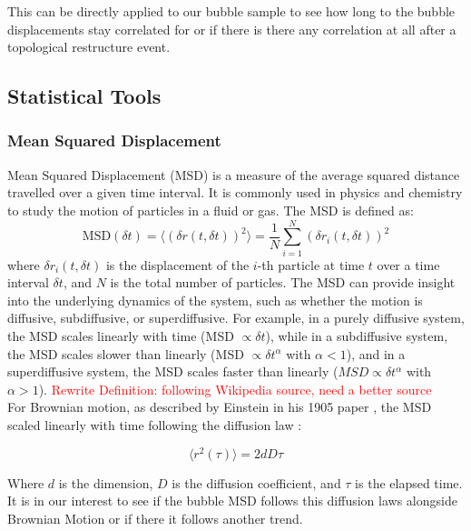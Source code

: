 This can be directly applied to our bubble sample to see how long to the bubble displacements stay correlated for or if there is there any correlation at all after a topological restructure event.


\subsection{Statistical Tools}
\subsubsection{Mean Squared Displacement}
Mean Squared Displacement (MSD) is a measure of the average squared distance travelled over a given time interval. It is commonly used in physics and chemistry to study the motion of particles in a fluid or gas. The MSD is defined as:
\begin{equation}
    \text{MSD}(\delta t) = \langle (\delta r(t, \delta t))^2 \rangle = \frac{1}{N} \sum_{i=1}^{N} (\delta r_i(t, \delta t))^2
\end{equation}
where $\delta r_i(t, \delta t)$ is the displacement of the $i$-th particle at time $t$ over a time interval $\delta t$, and $N$ is the total number of particles. The MSD can provide insight into the underlying dynamics of the system, such as whether the motion is diffusive, subdiffusive, or superdiffusive. For example, in a purely diffusive system, the MSD scales linearly with time (MSD $\propto \delta t$), while in a subdiffusive system, the MSD scales slower than linearly (MSD $\propto \delta t^\alpha$ with $\alpha < 1$), and in a superdiffusive system, the MSD scales faster than linearly ($MSD \propto \delta t^\alpha$ with $\alpha > 1$). \textcolor{red}{Rewrite Definition: following Wikipedia source, need a better source}\\

For Brownian motion, as described by Einstein in his 1905 paper , the MSD scaled linearly with time following the diffusion law \cite{EinsteinMSD}:

\begin{equation}
    \langle r^2 (\tau) \rangle = 2dD\tau
\end{equation}

Where $d$ is the dimension, $D$ is the diffusion coefficient, and $\tau$ is the elapsed time. It is in our interest to see if the bubble MSD follows this diffusion laws alongside Brownian Motion or if there it follows another trend.


